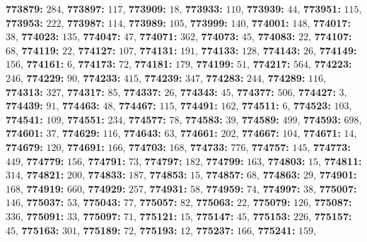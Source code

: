 \textsf{\bfseries 773879:} $284$, \textsf{\bfseries 773897:} $117$, \textsf{\bfseries 773909:} $18$, \textsf{\bfseries 773933:} $110$, \textsf{\bfseries 773939:} $44$, \textsf{\bfseries 773951:} $115$, \textsf{\bfseries 773953:} $222$, \textsf{\bfseries 773987:} $114$, \textsf{\bfseries 773989:} $105$, \textsf{\bfseries 773999:} $140$, \textsf{\bfseries 774001:} $148$, \textsf{\bfseries 774017:} $38$, \textsf{\bfseries 774023:} $135$, \textsf{\bfseries 774047:} $47$, \textsf{\bfseries 774071:} $362$, \textsf{\bfseries 774073:} $45$, \textsf{\bfseries 774083:} $22$, \textsf{\bfseries 774107:} $68$, \textsf{\bfseries 774119:} $22$, \textsf{\bfseries 774127:} $107$, \textsf{\bfseries 774131:} $191$, \textsf{\bfseries 774133:} $128$, \textsf{\bfseries 774143:} $26$, \textsf{\bfseries 774149:} $156$, \textsf{\bfseries 774161:} $6$, \textsf{\bfseries 774173:} $72$, \textsf{\bfseries 774181:} $179$, \textsf{\bfseries 774199:} $51$, \textsf{\bfseries 774217:} $564$, \textsf{\bfseries 774223:} $246$, \textsf{\bfseries 774229:} $90$, \textsf{\bfseries 774233:} $415$, \textsf{\bfseries 774239:} $347$, \textsf{\bfseries 774283:} $244$, \textsf{\bfseries 774289:} $116$, \textsf{\bfseries 774313:} $327$, \textsf{\bfseries 774317:} $85$, \textsf{\bfseries 774337:} $26$, \textsf{\bfseries 774343:} $45$, \textsf{\bfseries 774377:} $506$, \textsf{\bfseries 774427:} $3$, \textsf{\bfseries 774439:} $91$, \textsf{\bfseries 774463:} $48$, \textsf{\bfseries 774467:} $115$, \textsf{\bfseries 774491:} $162$, \textsf{\bfseries 774511:} $6$, \textsf{\bfseries 774523:} $103$, \textsf{\bfseries 774541:} $109$, \textsf{\bfseries 774551:} $234$, \textsf{\bfseries 774577:} $78$, \textsf{\bfseries 774583:} $39$, \textsf{\bfseries 774589:} $499$, \textsf{\bfseries 774593:} $698$, \textsf{\bfseries 774601:} $37$, \textsf{\bfseries 774629:} $116$, \textsf{\bfseries 774643:} $63$, \textsf{\bfseries 774661:} $202$, \textsf{\bfseries 774667:} $104$, \textsf{\bfseries 774671:} $14$, \textsf{\bfseries 774679:} $120$, \textsf{\bfseries 774691:} $166$, \textsf{\bfseries 774703:} $168$, \textsf{\bfseries 774733:} $776$, \textsf{\bfseries 774757:} $145$, \textsf{\bfseries 774773:} $449$, \textsf{\bfseries 774779:} $156$, \textsf{\bfseries 774791:} $73$, \textsf{\bfseries 774797:} $182$, \textsf{\bfseries 774799:} $163$, \textsf{\bfseries 774803:} $15$, \textsf{\bfseries 774811:} $314$, \textsf{\bfseries 774821:} $200$, \textsf{\bfseries 774833:} $187$, \textsf{\bfseries 774853:} $15$, \textsf{\bfseries 774857:} $68$, \textsf{\bfseries 774863:} $29$, \textsf{\bfseries 774901:} $168$, \textsf{\bfseries 774919:} $660$, \textsf{\bfseries 774929:} $257$, \textsf{\bfseries 774931:} $58$, \textsf{\bfseries 774959:} $74$, \textsf{\bfseries 774997:} $38$, \textsf{\bfseries 775007:} $146$, \textsf{\bfseries 775037:} $53$, \textsf{\bfseries 775043:} $77$, \textsf{\bfseries 775057:} $82$, \textsf{\bfseries 775063:} $22$, \textsf{\bfseries 775079:} $126$, \textsf{\bfseries 775087:} $336$, \textsf{\bfseries 775091:} $33$, \textsf{\bfseries 775097:} $71$, \textsf{\bfseries 775121:} $15$, \textsf{\bfseries 775147:} $45$, \textsf{\bfseries 775153:} $226$, \textsf{\bfseries 775157:} $45$, \textsf{\bfseries 775163:} $301$, \textsf{\bfseries 775189:} $72$, \textsf{\bfseries 775193:} $12$, \textsf{\bfseries 775237:} $166$, \textsf{\bfseries 775241:} $159$, 
